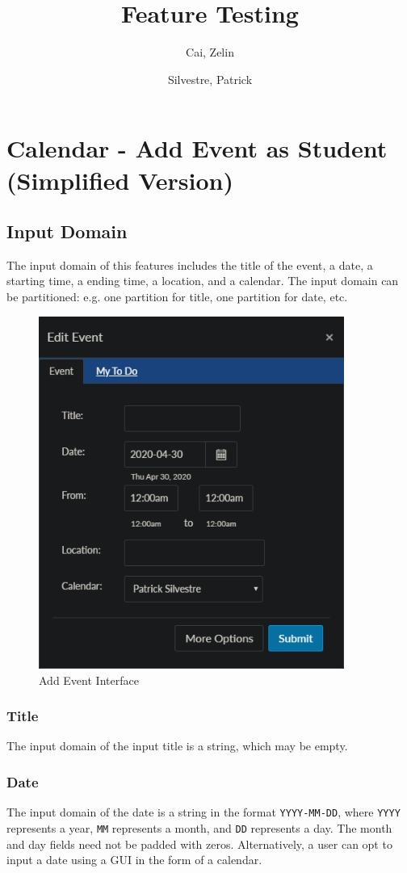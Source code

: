 \documentclass[10pt,letterpaper]{article}
\title{Feature Testing}
\author{
	Cai, Zelin\\
	\and
	Silvestre, Patrick\\
}
\date{}
\begin{document}
\maketitle
\section{Calendar - Add Event as Student (Simplified Version)}
\subsection{Input Domain}
The input domain of this features includes the title of the event, a date, a starting time, a ending time, a location, and a calendar. The input domain can be partitioned: e.g. one partition for title, one partition for date, etc.

\begin{figure}[h]
	\centerline{\includegraphics[width=10cm]{screenshots/edit-event.png}}
	\caption{Add Event Interface}
\end{figure}

\newpage
\subsubsection{Title}
The input domain of the input title is a string, which may be empty.

\subsubsection{Date}
The input domain of the date is a string in the format \texttt{YYYY-MM-DD}, where \texttt{YYYY} represents a year, \texttt{MM} represents a month, and \texttt{DD} represents a day. The month and day fields need not be padded with zeros. Alternatively, a user can opt to input a date using a GUI in the form of a calendar.
\end{document}
